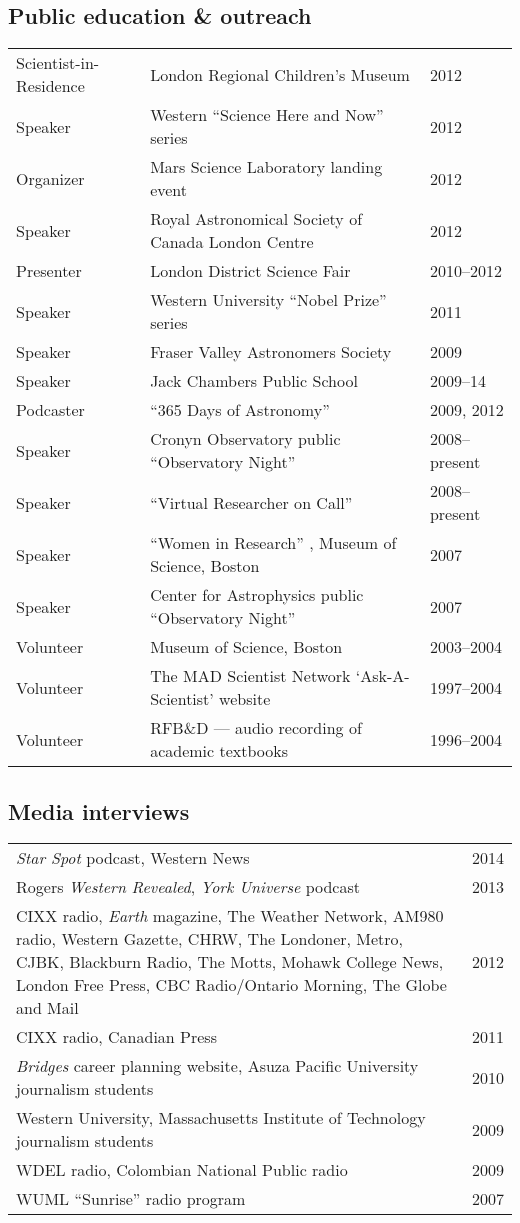 \documentclass[12pt]{article}
\begin{document}
\subsection{Public education \& outreach}
\begin{tabular}{lp{11cm}l}
Scientist-in-Residence& London Regional Children's Museum& 2012\\
Speaker& Western ``Science Here and Now'' series& 2012\\
Organizer& Mars Science Laboratory landing event& 2012\\
Speaker& Royal Astronomical Society of Canada London Centre& 2012\\
Presenter& London District Science Fair& 2010--2012\\
Speaker& Western University ``Nobel Prize'' series& 2011\\
Speaker& Fraser Valley Astronomers Society& 2009\\
Speaker& Jack Chambers Public School& 2009--14\\
Podcaster &  ``365 Days of Astronomy''  &2009, 2012\\
Speaker& Cronyn Observatory public ``Observatory Night'' & 2008--present\\
Speaker& ``Virtual Researcher on Call'' & 2008--present\\
Speaker & ``Women in Research'' , Museum of Science, Boston& 2007\\
Speaker& Center for Astrophysics public ``Observatory Night'' & 2007\\
Volunteer& Museum of Science, Boston& 2003--2004\\
Volunteer& The MAD Scientist Network `Ask-A-Scientist' website& 1997--2004\\
Volunteer& RFB\&D --- audio recording of academic textbooks& 1996--2004\\
\end{tabular}

\subsection{Media interviews}
\begin{tabular}{p{15cm}l}
{\em Star Spot} podcast, Western News & 2014\\
Rogers {\em Western Revealed}, {\em York Universe} podcast & 2013\\
CIXX radio, {\em Earth} magazine, The Weather Network, AM980 radio, Western Gazette, CHRW, The Londoner, Metro, CJBK, Blackburn Radio, The Motts, Mohawk College News, London Free Press, CBC Radio/Ontario Morning, The Globe and Mail& 2012\\
CIXX radio, Canadian Press&  2011\\
{\em Bridges} career planning website, Asuza Pacific University journalism students& 2010\\
Western University, Massachusetts Institute of Technology journalism students& 2009\\
WDEL radio, Colombian National Public radio & 2009\\ 
WUML ``Sunrise'' radio program & 2007\\ 
\end{tabular}
\end{document}
